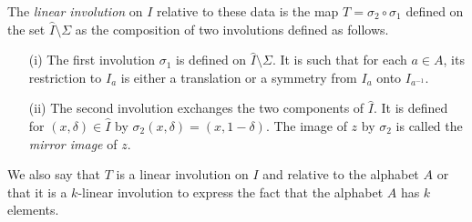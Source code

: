\documentclass[preprint,12pt]{elsarticle}
\numberwithin{theorem}{section}
\numberwithin{equation}{section}
\numberwithin{figure}{section}
\numberwithin{table}{section}
\begin{document}
The \emph{linear involution} on $I$ relative to these data is the
map $T=\sigma_2\circ\sigma_1$ defined on the set
$\hat{I}\setminus\Sigma$ as 
the composition
of two involutions defined as follows. 
\begin{enumerate}
\item[(i)]The first involution $\sigma_1$ is defined on $\hat{I}\setminus\Sigma$.
It is such that for each $a\in A$, its restriction to $I_a$
is either a translation or a symmetry from $I_a$ onto $I_{a^{-1}}$.

\item[(ii)]The second involution exchanges the two components of
  $\hat{I}$.
It  is defined for $(x,\delta)\in \hat{I}$
by $\sigma_2(x,\delta)=(x,1-\delta)$. The image of $z$ by $\sigma_2$
is called the \emph{mirror image} of $z$.
\end{enumerate}
We also say that $T$ is a linear involution on $I$ and relative to
 the alphabet $A$
or that it is a $k$-linear involution to express the fact
that the alphabet $A$ has $k$ elements.
\end{document}
